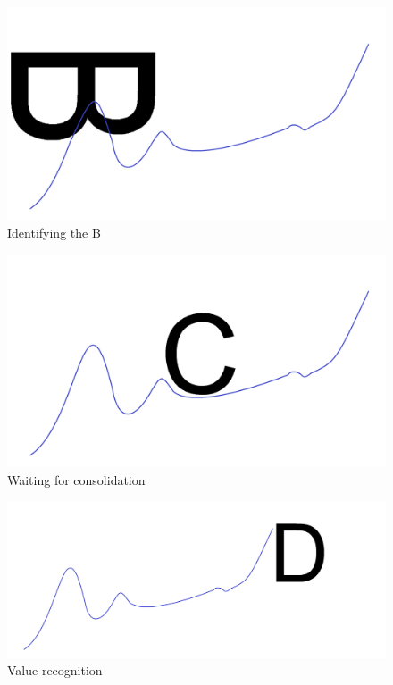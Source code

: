 \documentclass{article}
\begin{document}
\vspace{10pt}

\begin{figure}[!htb]
    \centering
    \includegraphics[width=\textwidth]{imgs/57.png}
    \caption{Identifying the B}
\end{figure}

\vspace{10pt}

\begin{figure}[!htb]
    \centering
    \includegraphics[width=\textwidth]{imgs/58.png}
    \caption{Waiting for consolidation}
\end{figure}

\vspace{10pt}

\begin{figure}[!htb]
    \centering
    \includegraphics[width=\textwidth]{imgs/59.png}
    \caption{Value recognition}
\end{figure}
\end{document}
